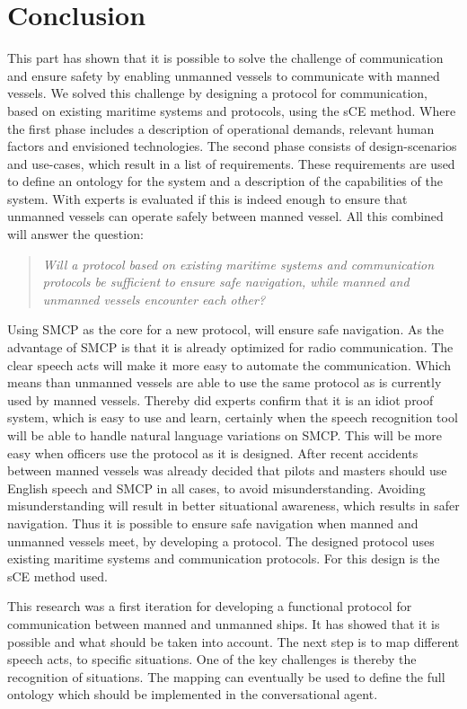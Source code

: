 \chapter{Conclusion}
This part has shown that it is possible to solve the challenge of communication and ensure safety by enabling unmanned vessels to communicate with manned vessels. We solved this challenge by designing a protocol for communication, based on existing maritime systems and protocols, using the \acf{sCE} method. Where the first phase includes a description of operational demands, relevant human factors and envisioned technologies. The second phase consists of design-scenarios and use-cases, which result in a list of requirements. These requirements are used to define an ontology for the system and a description of the capabilities of the system. With experts is evaluated if this is indeed enough to ensure that unmanned vessels can operate safely between manned vessel. All this combined will answer the question:

\begin{quotation}
	\emph{Will a protocol based on existing maritime systems and communication protocols be sufficient to ensure safe navigation, while manned and unmanned vessels encounter each other?}
\end{quotation}

Using \acf{SMCP} as the core for a new protocol, will ensure safe navigation. As the advantage of \ac{SMCP} is that it is already optimized for radio communication. The clear speech acts will make it more easy to automate the communication. Which means than unmanned vessels are able to use the same protocol as is currently used by manned vessels. Thereby did experts confirm that it is an idiot proof system, which is easy to use and learn, certainly when the speech recognition tool will be able to handle natural language variations on \ac{SMCP}.
This will be more easy when officers use the protocol as it is designed. After recent accidents between manned vessels was already decided that pilots and masters should use English speech and \ac{SMCP} in all cases, to avoid misunderstanding. Avoiding misunderstanding will result in better situational awareness, which results in safer navigation.
Thus it is possible to ensure safe navigation when manned and unmanned vessels meet, by developing a protocol. The designed protocol uses existing maritime systems and communication protocols. For this design is the \acf{sCE} method used.

This research was a first iteration for developing a functional protocol for communication between manned and unmanned ships. It has showed that it is possible and what should be taken into account. 
The next step is to map different speech acts, to specific situations. One of the key challenges is thereby the recognition of situations. The mapping can eventually be used to define the full ontology which should be implemented in the conversational agent.